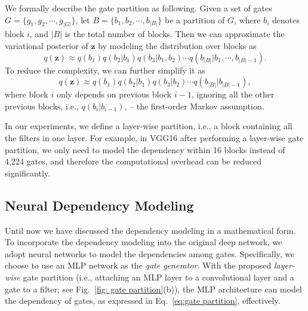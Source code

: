 \documentclass[runningheads, envcountsame, a4paper]{llncs}
\def\bs{\boldsymbol}
\begin{document}
We formally describe the gate partition as following. Given a set of gates $G=\{g_1,g_2,\cdots,g_{|G|}\}$, let $B=\{b_1,b_2,\cdots,b_{|B|}\}$ be a partition of $G$, where $b_i$ denotes block $i$, and $|B|$ is the total number of blocks. Then we can approximate the variational posterior of $\bs{z}$ by modeling the distribution over blocks as
\[
q(\bs{z}) \approx q(b_1) q(b_2|b_1) q(b_3|b_1,b_2)\cdots q(b_{|B|}|b_{1},\cdots,b_{|B|-1}).
\]
To reduce the complexity, we can further simplify it as
\begin{equation}\label{eq:gate partition}
q(\bs{z}) \approx q(b_1) q(b_2|b_1) q(b_3|b_2)\cdots q(b_{|B|}| b_{|B|-1}),
\end{equation}
where block $i$ only depends on previous block $i-1$, ignoring all the other previous blocks, i.e., $q(b_i|b_{i-1})$, -- the first-order Markov assumption.


In our experiments, we define a layer-wise partition, i.e., a block containing all the filters in one layer. For example, in VGG16 after performing a layer-wise gate partition, we only need to model the dependency within 16 blocks instead of 4,224 gates, and therefore the computational overhead can be reduced significantly.

\subsection{Neural Dependency Modeling}
\label{sec:Neural Dependency Modeling}
Until now we have discussed the dependency modeling in a mathematical form. To incorporate the dependency modeling into the original deep network, we adopt neural networks to model the dependencies among gates. Specifically, we choose to use an MLP network as the \textit{gate generator}. With the proposed \textit{layer-wise} gate partition (i.e., attaching an MLP layer to a convolutional layer and a gate to a filter; see Fig.~\ref{fig: gate partition}(b)), the MLP architecture can model the dependency of gates, as expressed in Eq.~\ref{eq:gate partition}, effectively. 
\end{document}
